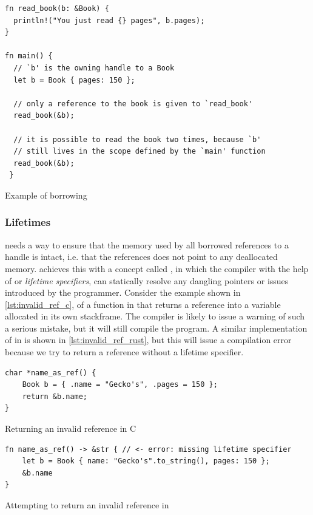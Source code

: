 \begin{listing}[tb]
\begin{verbatim}
fn read_book(b: &Book) {
  println!("You just read {} pages", b.pages);
}

fn main() {
  // `b' is the owning handle to a Book
  let b = Book { pages: 150 };

  // only a reference to the book is given to `read_book'
  read_book(&b);

  // it is possible to read the book two times, because `b'
  // still lives in the scope defined by the `main' function
  read_book(&b);
 }
\end{verbatim}
\caption{Example of borrowing}
\label{lst:borrowing_handle}
\end{listing}

\subsubsection{Lifetimes}
\label{ssec:lifetimes}

\rust needs a way to ensure that the memory used by all borrowed references to a handle is intact, i.e. that the references does not point to any deallocated memory.
\rust achieves this with a concept called , in which the compiler with the help of  or \emph{lifetime specifiers}, can statically resolve any dangling pointers or  issues introduced by the programmer.
Consider the example shown in \autoref{lst:invalid_ref_c}, of a function in {\C} that returns a reference into a variable allocated in its own stackframe.
The {\C} compiler is likely to issue a warning of such a serious mistake, but it will still compile the program.
A similar implementation of  in {\rust} is shown in \autoref{lst:invalid_ref_rust}, but this will issue a compilation error because we try to return a reference without a lifetime specifier.

\begin{listing}[tb]
\begin{verbatim}
char *name_as_ref() {
    Book b = { .name = "Gecko's", .pages = 150 };
    return &b.name;
}
\end{verbatim}
\caption{Returning an invalid reference in C}
\label{lst:invalid_ref_c}
\end{listing}

\begin{listing}[tb]
\begin{verbatim}
fn name_as_ref() -> &str { // <- error: missing lifetime specifier
    let b = Book { name: "Gecko's".to_string(), pages: 150 };
    &b.name
}
\end{verbatim}
\caption{Attempting to return an invalid reference in {\rust}}
\label{lst:invalid_ref_rust}
\end{listing}

